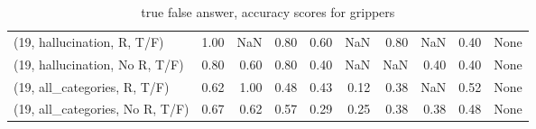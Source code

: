 \begin{table*}[h!]
\begin{adjustbox}{width=2\columnwidth,center}
\begin{tabular}{lrrr|rrr|rrr}
(19, hallucination, R, T/F)           &                      1.00 &                   NaN &                      0.80 &                          0.60 &                       NaN &                          0.80 &                                    NaN &                               0.40 &                                  None \\
(19, hallucination, No R, T/F)        &                      0.80 &                  0.60 &                      0.80 &                          0.40 &                       NaN &                           NaN &                                   0.40 &                               0.40 &                                  None \\
(19, all\_categories, R, T/F)          &                      0.62 &                  1.00 &                      0.48 &                          0.43 &                      0.12 &                          0.38 &                                    NaN &                               0.52 &                                  None \\
(19, all\_categories, No R, T/F)       &                      0.67 &                  0.62 &                      0.57 &                          0.29 &                      0.25 &                          0.38 &                                   0.38 &                               0.48 &                                  None \\


\bottomrule
\end{tabular}
\end{adjustbox}
\caption{true false answer, accuracy scores for grippers}
\end{table*}